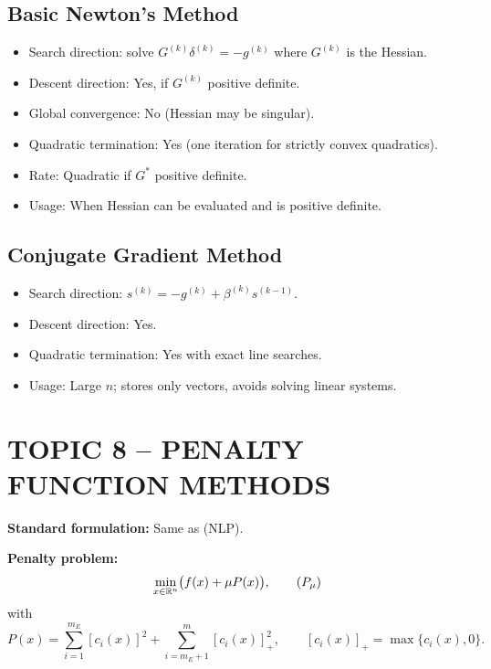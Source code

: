 \documentclass[12pt]{article}
\begin{document}
\subsection*{Basic Newton's Method}
\begin{itemize}
  \item Search direction: solve $G^{(k)} \delta^{(k)} = -g^{(k)}$ where $G^{(k)}$ is the Hessian.
  \item Descent direction: Yes, if $G^{(k)}$ positive definite.
  \item Global convergence: No (Hessian may be singular).
  \item Quadratic termination: Yes (one iteration for strictly convex quadratics).
  \item Rate: Quadratic if $G^*$ positive definite.
  \item Usage: When Hessian can be evaluated and is positive definite.
\end{itemize}

\subsection*{Conjugate Gradient Method}
\begin{itemize}
  \item Search direction: $s^{(k)} = -g^{(k)} + \beta^{(k)} s^{(k-1)}$.
  \item Descent direction: Yes.
  \item Quadratic termination: Yes with exact line searches.
  \item Usage: Large $n$; stores only vectors, avoids solving linear systems.
\end{itemize}

\bigskip
\section*{TOPIC 8 -- PENALTY FUNCTION METHODS}

\textbf{Standard formulation:} Same as (NLP).

\textbf{Penalty problem:}
\begin{equation*}
  \min_{x\in\mathbb{R}^n} \bigl( f(x) + \mu P(x) \bigr), \tag{$P_{\mu}$}
\end{equation*}
with
\[
  P(x) = \sum_{i=1}^{m_E} [c_i(x)]^2 + \sum_{i=m_E+1}^{m} [c_i(x)]_{+}^2, \qquad [c_i(x)]_{+}=\max\{c_i(x),0\}.
\]
\end{document}
